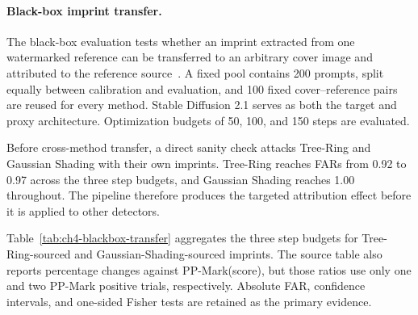 \paragraph{Black-box imprint transfer.}
The black-box evaluation tests whether an imprint extracted from one watermarked
reference can be transferred to an arbitrary cover image and attributed to the
reference source~\cite{muller2025blackbox}.  A fixed pool contains 200 prompts,
split equally between calibration and evaluation, and 100 fixed cover--reference
pairs are reused for every method.  Stable Diffusion 2.1 serves as both the target
and proxy architecture.  Optimization budgets of 50, 100, and 150 steps are
evaluated.

Before cross-method transfer, a direct sanity check attacks Tree-Ring and Gaussian
Shading with their own imprints.  Tree-Ring reaches FARs from 0.92 to 0.97 across
the three step budgets, and Gaussian Shading reaches 1.00 throughout.  The
pipeline therefore produces the targeted attribution effect before it is applied
to other detectors.

Table~\ref{tab:ch4-blackbox-transfer} aggregates the three step budgets for
Tree-Ring-sourced and Gaussian-Shading-sourced imprints.  The source table also
reports percentage changes against PP-Mark(score), but those ratios use only one
and two PP-Mark positive trials, respectively.  Absolute FAR, confidence
intervals, and one-sided Fisher tests are retained as the primary evidence.


